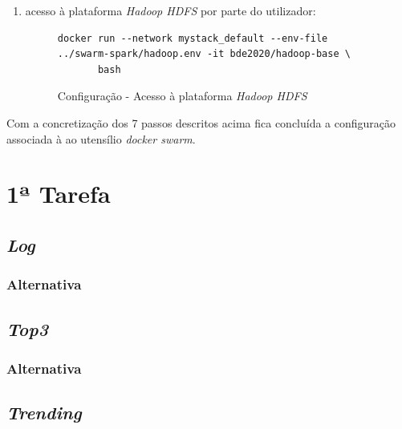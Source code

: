 \documentclass[a4paper]{report}
\begin{document}
{\begin{enumerate}[label=\textbf{\arabic*.}]
            \item acesso à plataforma \textit{Hadoop HDFS} por parte do utilizador:
            \begin{figure}[H]
                \centering
                \begin{verbatim}
docker run --network mystack_default --env-file ../swarm-spark/hadoop.env -it bde2020/hadoop-base \
       bash
                \end{verbatim}
                \caption{Configuração - Acesso à plataforma \textit{Hadoop HDFS}}
                \label{fig:12}
            \end{figure}
        \end{enumerate}}

        Com a concretização dos 7 passos descritos acima fica concluída a configuração associada à ao utensílio \textit{docker swarm}.

    \section{1ª Tarefa} \label{sec:Task1}


        \subsection{\textit{Log}} \label{subsec:Task1-Log}
            \subsubsection{Alternativa} \label{sssec:Task1-Log-Alternativa}

        \subsection{\textit{Top3}} \label{subsec:Task1-Top3}
            \subsubsection{Alternativa} \label{sssec:Task1-Top3-Alternativa} 

        \subsection{\textit{Trending}} \label{subsec:Task1-Trending}
\end{document}

